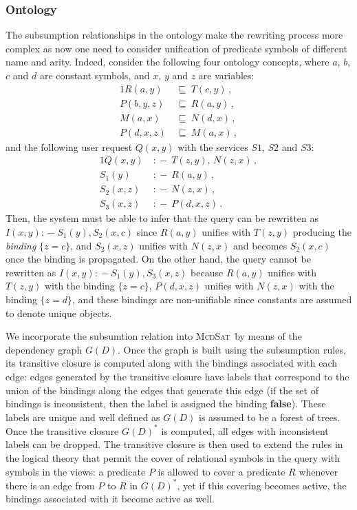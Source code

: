 \documentclass{llncs}
\newcommand{\mcdsat}{\textsc{McdSat}}
\newcommand{\qrule}{:\!\!-}
\newcommand{\orule}{\sqsubseteq}
\begin{document}
\subsubsection{Ontology}

The subsumption relationships in the ontology make the rewriting 
process more complex as now one need to consider unification of
predicate symbols of different name and arity. Indeed, consider
the following four ontology concepts, where $a$, $b$, $c$ and $d$
are constant symbols, and $x$, $y$ and $z$ are variables:
\begin{alignat*}{1}
R(a,y)\   &\orule\ T(c,y)\,, \\
P(b,y,z)\ &\orule\ R(a,y)\,, \\
M(a,x)\   &\orule\ N(d,x)\,, \\
P(d,x,z)\ &\orule\ M(a,x)\,,
\end{alignat*}
and the following user request $Q(x,y)$ with the services 
$S1$, $S2$ and $S3$:
\begin{alignat*}{1}
Q(x,y)\   &\qrule\ T(z,y),\,N(z,x)\,, \\
S_1(y)\   &\qrule\ R(a,y)\,, \\
S_2(x,z)\ &\qrule\ N(z,x)\,, \\
S_3(x,z)\ &\qrule\ P(d,x,z)\,.
\end{alignat*}
Then, the system must be able to infer that the query can be 
rewritten as $I(x,y) \qrule S_1(y),S_2(x,c)$ since $R(a,y)$
unifies with $T(z,y)$ producing the \emph{binding} $\{z=c\}$,
and $S_2(x,z)$ unifies with $N(z,x)$ and becomes $S_2(x,c)$
once the binding is propagated. On the other hand, the query
cannot be rewritten as $I(x,y)\qrule S_1(y),S_3(x,z)$ because
$R(a,y)$ unifies with $T(z,y)$ with the binding $\{z=c\}$,
$P(d,x,z)$ unifies with $N(z,x)$ with the binding $\{z=d\}$,
and these bindings are non-unifiable since constants
are assumed to denote unique objects.

We incorporate the subsumtion relation into \mcdsat\ by means
of the dependency graph $G(D)$. Once the graph is built using
the subsumption rules, its transitive closure is computed along
with the bindings associated with each edge: edges generated by
the transitive closure have labels that correspond to the union
of the bindings along the edges that generate this edge (if the
set of bindings is inconsistent, then the label is assigned the
binding \textbf{false}).
These labels are unique and well defined as $G(D)$ is assumed
to be a forest of trees. Once the transitive closure $G(D)^*$
is computed, all edges with inconsistent labels can be dropped.
The transitive closure is then used to extend the rules in the
logical theory that permit the cover of relational symbols in
the query with symbols in the views: a predicate $P$ is allowed
to cover a predicate $R$ whenever there is an edge from $P$ to
$R$ in $G(D)^*$, yet if this covering becomes active, the 
bindings associated with it become active as well.
\end{document}

